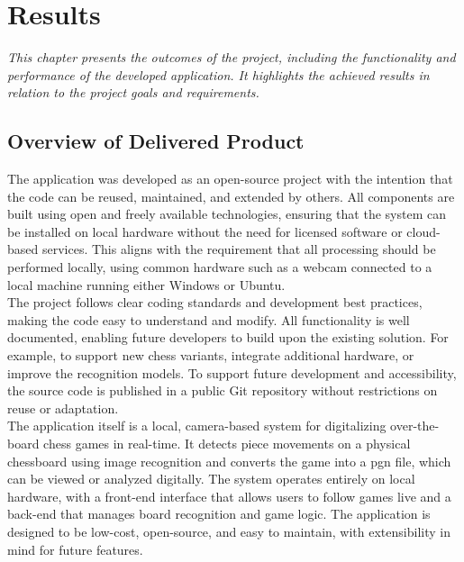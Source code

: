 \chapter{Results}

\begin{center}
    \textit{This chapter presents the outcomes of the project, including the functionality and performance of the developed application. It highlights the achieved results in relation to the project goals and requirements.}
\end{center}

\section{Overview of Delivered Product}
The application was developed as an open-source project with the intention that the code can be reused, maintained, and extended by others. All components are built using open and freely available technologies, ensuring that the system can be installed on local hardware without the need for licensed software or cloud-based services. This aligns with the requirement that all processing should be performed locally, using common hardware such as a webcam connected to a local machine running either Windows or Ubuntu. \\

The project follows clear coding standards and development best practices, making the code easy to understand and modify. All functionality is well documented, enabling future developers to build upon the existing solution. For example, to support new chess variants, integrate additional hardware, or improve the recognition models. To support future development and accessibility, the source code is published in a public Git repository without restrictions on reuse or adaptation. \\

The application itself is a local, camera-based system for digitalizing over-the-board chess games in real-time. It detects piece movements on a physical chessboard using image recognition and converts the game into a \gls{pgn} file, which can be viewed or analyzed digitally. The system operates entirely on local hardware, with a front-end interface that allows users to follow games live and a back-end that manages board recognition and game logic. The application is designed to be low-cost, open-source, and easy to maintain, with extensibility in mind for future features. \\

